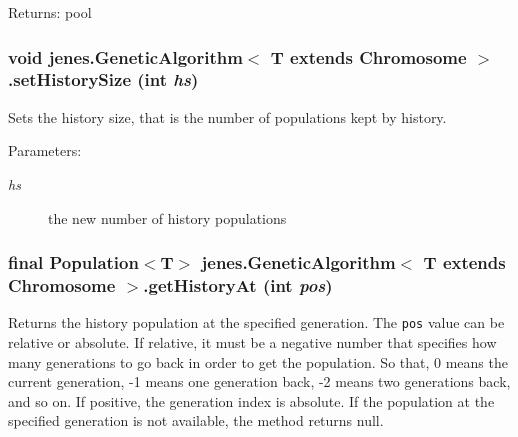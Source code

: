\begin{Desc}
\item[Returns:]pool \end{Desc}
\hypertarget{classjenes_1_1_genetic_algorithm_3_01_t_01extends_01_chromosome_01_4_71407144e93e7522d2d474c25781d65c}{
\subsubsection[setHistorySize]{\setlength{\rightskip}{0pt plus 5cm}void jenes.GeneticAlgorithm$<$ T extends Chromosome $>$.setHistorySize (int {\em hs})}}
\label{classjenes_1_1_genetic_algorithm_3_01_t_01extends_01_chromosome_01_4_71407144e93e7522d2d474c25781d65c}


Sets the history size, that is the number of populations kept by history.

\begin{Desc}
\item[Parameters:]
\begin{description}
\item[{\em hs}]the new number of history populations \end{description}
\end{Desc}
\hypertarget{classjenes_1_1_genetic_algorithm_3_01_t_01extends_01_chromosome_01_4_99718490498059da48833dfbdfc8076e}{
\subsubsection[getHistoryAt]{\setlength{\rightskip}{0pt plus 5cm}final Population$<$T$>$ jenes.GeneticAlgorithm$<$ T extends Chromosome $>$.getHistoryAt (int {\em pos})}}
\label{classjenes_1_1_genetic_algorithm_3_01_t_01extends_01_chromosome_01_4_99718490498059da48833dfbdfc8076e}


Returns the history population at the specified generation. The {\tt pos} value can be relative or absolute. If relative, it must be a negative number that specifies how many generations to go back in order to get the population. So that, 0 means the current generation, -1 means one generation back, -2 means two generations back, and so on. If positive, the generation index is absolute. If the population at the specified generation is not available, the method returns null. 

